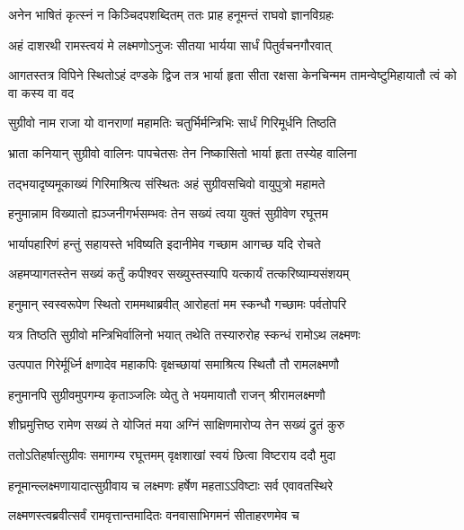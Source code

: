 \twolineshloka
{अनेन भाषितं कृत्स्नं न किञ्चिदपशब्दितम्}
{ततः प्राह हनूमन्तं राघवो ज्ञानविग्रहः} %

\twolineshloka
{अहं दाशरथी रामस्त्वयं मे लक्ष्मणोऽनुजः}
{सीतया भार्यया सार्धं पितुर्वचनगौरवात्} %

\threelineshloka
{आगतस्तत्र विपिने स्थितोऽहं दण्डके द्विज}
{तत्र भार्या हृता सीता रक्षसा केनचिन्मम}
{तामन्वेष्टुमिहायातौ त्वं को वा कस्य वा वद} %


\twolineshloka
{सुग्रीवो नाम राजा यो वानराणां महामतिः}
{चतुर्भिर्मन्त्रिभिः सार्धं गिरिमूर्धनि तिष्ठति} %

\twolineshloka
{भ्राता कनियान् सुग्रीवो वालिनः पापचेतसः}
{तेन निष्कासितो भार्या हृता तस्येह वालिना} %

\twolineshloka
{तद्भयादृष्यमूकाख्यं गिरिमाश्रित्य संस्थितः}
{अहं सुग्रीवसचिवो वायुपुत्रो महामते} %

\twolineshloka
{हनुमान्नाम विख्यातो ह्यञ्जनीगर्भसम्भवः}
{तेन सख्यं त्वया युक्तं सुग्रीवेण रघूत्तम} %

\twolineshloka
{भार्यापहारिणं हन्तुं सहायस्ते भविष्यति}
{इदानीमेव गच्छाम आगच्छ यदि रोचते} %


\twolineshloka
{अहमप्यागतस्तेन सख्यं कर्तुं कपीश्वर}
{सख्युस्तस्यापि यत्कार्यं तत्करिष्याम्यसंशयम्} %

\twolineshloka
{हनुमान् स्वस्वरूपेण स्थितो राममथाब्रवीत्}
{आरोहतां मम स्कन्धौ गच्छामः पर्वतोपरि} %

\twolineshloka
{यत्र तिष्ठति सुग्रीवो मन्त्रिभिर्वालिनो भयात्}
{तथेति तस्यारुरोह स्कन्धं रामोऽथ लक्ष्मणः} %

\twolineshloka
{उत्पपात गिरेर्मूर्ध्नि क्षणादेव महाकपिः}
{वृक्षच्छायां समाश्रित्य स्थितौ तौ रामलक्ष्मणौ} %

\twolineshloka
{हनुमानपि सुग्रीवमुपगम्य कृताञ्जलिः}
{व्येतु ते भयमायातौ राजन् श्रीरामलक्ष्मणौ} %

\twolineshloka
{शीघ्रमुत्तिष्ठ रामेण सख्यं ते योजितं मया}
{अग्निं साक्षिणमारोप्य तेन सख्यं द्रुतं कुरु} %

\twolineshloka
{ततोऽतिहर्षात्सुग्रीवः समागम्य रघूत्तमम्}
{वृक्षशाखां स्वयं छित्वा विष्टराय ददौ मुदा} %

\twolineshloka
{हनूमान्ल्लक्ष्मणायादात्सुग्रीवाय च लक्ष्मणः}
{हर्षेण महताऽऽविष्टाः सर्व एवावतस्थिरे} %

\twolineshloka
{लक्ष्मणस्त्वब्रवीत्सर्वं रामवृत्तान्तमादितः}
{वनवासाभिगमनं सीताहरणमेव च} %

